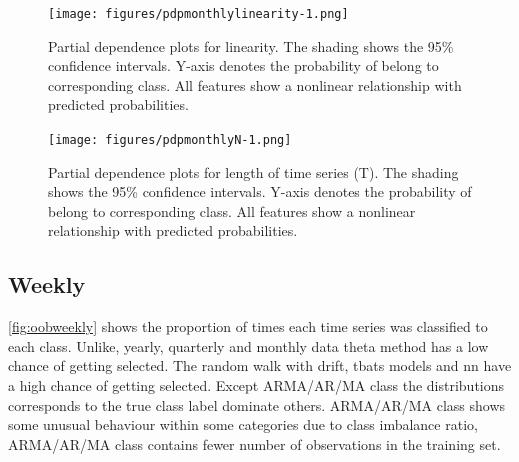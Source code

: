 \documentclass[11pt,a4paper,]{article}
\begin{document}
\begin{figure}
\centering
\texttt{[image: figures/pdpmonthlylinearity-1.png]}
\caption{\label{fig:pdpmonthlylinearity}Partial dependence plots for
linearity. The shading shows the 95\% confidence intervals. Y-axis
denotes the probability of belong to corresponding class. All features
show a nonlinear relationship with predicted probabilities.}
\end{figure}

\begin{figure}
\centering
\texttt{[image: figures/pdpmonthlyN-1.png]}
\caption{\label{fig:pdpmonthlyN}Partial dependence plots for length of time
series (T). The shading shows the 95\% confidence intervals. Y-axis
denotes the probability of belong to corresponding class. All features
show a nonlinear relationship with predicted probabilities.}
\end{figure}

\subsection{Weekly}\label{weekly}

\autoref{fig:oobweekly} shows the proportion of times each time series
was classified to each class. Unlike, yearly, quarterly and monthly data
theta method has a low chance of getting selected. The random walk with
drift, tbats models and nn have a high chance of getting selected.
Except ARMA/AR/MA class the distributions corresponds to the true class
label dominate others. ARMA/AR/MA class shows some unusual behaviour
within some categories due to class imbalance ratio, ARMA/AR/MA class
contains fewer number of observations in the training set.
\end{document}
